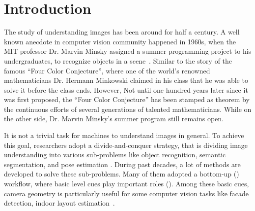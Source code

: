 \chapter{Introduction}
\label{chap:intro}

\makeatletter
\newenvironment{chapquote}[2][2em]
{\setlength{\@tempdima}{#1} \def\chapquote@author{#2} \parshape 1
  \@tempdima \dimexpr\textwidth-2\@tempdima\relax \itshape}
{\par\normalfont\hfill--\
\chapquote@author\hspace*{\@tempdima}\par\bigskip}
\makeatother



The study of understanding images has been around for half a century.
A well known anecdote in computer vision community happened in 1960s,
when the MIT professor Dr. Marvin Minsky assigned a summer programming
project to his undergraduates, to recognize objects in a
scene~\cite{boden2006mind}. 
%
Similar to the story of the famous ``Four Color Conjecture'', where
one of the world's renowned mathematicians Dr. Hermann Minkowski
claimed in his class that he was able to solve it before the class
ends.  
However, Not until one hundred years later since it was first
proposed, the ``Four Color Conjecture'' has been stamped as theorem by
the continuous efforts of several generations of talented
mathematicians.  While on the other side, Dr. Marvin Minsky's summer
program still remains open.

It is not a trivial task for machines to understand images in general.
To achieve this goal, researchers adopt a divide-and-conquer strategy,
that is dividing image understanding into various sub-problems like
object recognition, semantic segmentation, and pose estimation \etc.
During past decades, a lot of methods are developed to solve
these
sub-problems. Many of them adopted a bottom-up ()
workflow, where basic level cues play important roles
(). Among these basic cues, camera geometry is
particularly useful for some computer vision tasks like facade
detection, indoor layout estimation~\cite{ren2016coarse}.

